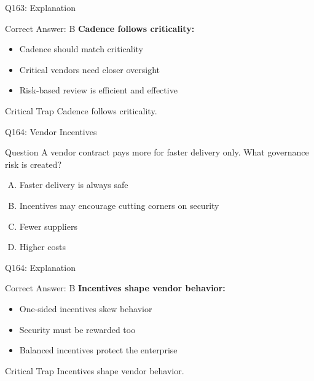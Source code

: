 \documentclass{beamer}
\begin{document}
	\begin{frame}{Q163: Explanation}
		\begin{block}{Correct Answer: B}
			\textbf{Cadence follows criticality:}
			\begin{itemize}
				\item Cadence should match criticality
				\item Critical vendors need closer oversight
				\item Risk-based review is efficient and effective
			\end{itemize}
		\end{block}
		\begin{alertblock}{Critical Trap}
			Cadence follows criticality.
		\end{alertblock}
	\end{frame}
	
	\begin{frame}{Q164: Vendor Incentives}
		\begin{block}{Question}
			A vendor contract pays more for faster delivery only. What governance risk is created?
		\end{block}
		\begin{enumerate}[(A)]
			\item Faster delivery is always safe
			\item Incentives may encourage cutting corners on security
			\item Fewer suppliers
			\item Higher costs
		\end{enumerate}
	\end{frame}
	
	\begin{frame}{Q164: Explanation}
		\begin{block}{Correct Answer: B}
			\textbf{Incentives shape vendor behavior:}
			\begin{itemize}
				\item One-sided incentives skew behavior
				\item Security must be rewarded too
				\item Balanced incentives protect the enterprise
			\end{itemize}
		\end{block}
		\begin{alertblock}{Critical Trap}
			Incentives shape vendor behavior.
		\end{alertblock}
	\end{frame}
	
\end{document}
